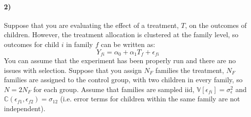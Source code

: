 \documentclass[12pt]{article}
\newcommand\BB{\mathbb}
\newcommand\eps{\epsilon}
\numberwithin{equation}{section}
\numberwithin{figure}{section}
\numberwithin{table}{section}
\begin{document}
\paragraph{2)} Suppose that you are evaluating the effect of a treatment, $T$, on the outcomes of children. However, the treatment allocation is clustered at the family level, so outcomes for child $i$ in family $f$ can be written as:
\[Y_{fi} = \alpha_0 + \alpha_1 T_{f} + \eps_{fi} \]
You can assume that the experiment has been properly run and there are no issues with selection. Suppose that you assign $N_F$ families the treatment, $N_F$ families  are assigned to the control group, with two children in every family, so $N=2N_F$ for each group. Assume that families are sampled iid, $\BB{V}[\eps_{fi}]=\sigma^2_\eps$ and $\BB{C}(\eps_{f1},\eps_{f2})=\sigma_{12}$ (i.e. error terms for children within the same family are not independent).
\end{document}
